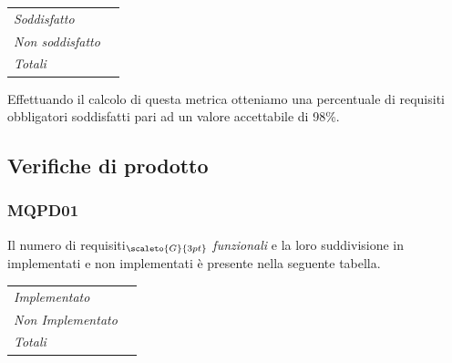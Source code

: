 {{{{\quad
\def\tabularxcolumn#1{m{#1}}
{
	\begin{center}
		\renewcommand{\arraystretch}{1.4}
		\begin{longtable}[c]{|p{4cm}|p{3cm}|}
			\hline
			\rowcolor{airforceblue}
			\makecell[c]{\textbf{Realizzazione}} & \makecell[c]{\textbf{Quantità}}\\
			\hline
			\textit{Soddisfatto} & \makecell[c]{45}\\
			\hline
			\textit{Non soddisfatto} & \makecell[c]{1} \\
			\hline
			\textit{Totali} & \makecell[c]{46} \\
		\end{longtable}
		\captionof{table}{\textbf{PROS}}
	\end{center}

Effettuando il calcolo di questa metrica otteniamo una percentuale di requisiti obbligatori soddisfatti pari ad un valore accettabile di 98\%.

\subsection{Verifiche di prodotto}\label{ResocontoAttivitàDiVerificaRevisioneDiQualificaVerificheDiProdotto}

\subsubsection{MQPD01}\label{ResocontoAttivitàDiVerificaRevisioneDiQualificaVerificheDiProcessoMQPD01}

Il numero di requisiti$_{\scaleto{G}{3pt}}$ \textit{funzionali} e la loro suddivisione in implementati e non implementati è presente nella seguente tabella.

\quad
\def\tabularxcolumn#1{m{#1}}
{
	\begin{center}
		\renewcommand{\arraystretch}{1.4}
		\begin{longtable}[c]{|p{4cm}|p{3cm}|}
			\hline
			\rowcolor{airforceblue}
			\makecell[c]{\textbf{Realizzazione}} & \makecell[c]{\textbf{Quantità}}\\
			\hline
			\textit{Implementato} & \makecell[c]{35}\\
			\hline
			\textit{Non Implementato} & \makecell[c]{22} \\
			\hline
			\textit{Totali} & \makecell[c]{57} \\
		\end{longtable}
	\end{center}

}}}}}}

